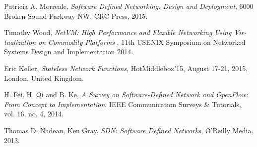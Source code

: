 ﻿\documentclass[11pt]{article}
\begin{document}
\begin{thebibliography}{9}
	\begin{latin}
		Patricia A. Morreale,
		\emph{Software Defined Networking: Design and Deployment},
		6000 Broken Sound Parkway NW,
		CRC Press,
		2015.
	\end{latin}
	\begin{latin}
		Timothy Wood,
		\emph{NetVM: High Performance and Flexible Networking
Using Virtualization on Commodity Platforms },
		11th USENIX Symposium on Networked Systems Design and Implementation
  		2014.
	\end{latin}
	\begin{latin}
		Eric Keller,
		\emph{Stateless Network Functions},
		HotMiddlebox’15, August 17-21, 2015, London, United Kingdom.
	\end{latin}
	\begin{latin}
		H. Fei, H. Qi and B. Ke,
		\emph{A Survey on Software-Defined Network and OpenFlow: From Concept to Implementation},
		IEEE Communication Surveys \& Tutorials, vol. 16, no. 4,
 		2014.
	\end{latin}
	\begin{latin}
		Thomas D. Nadeau, Ken Gray,
		\emph{SDN: Software Defined Networks},
		O'Reilly Media,
		2013.
	\end{latin}
\end{thebibliography}
\end{document}
